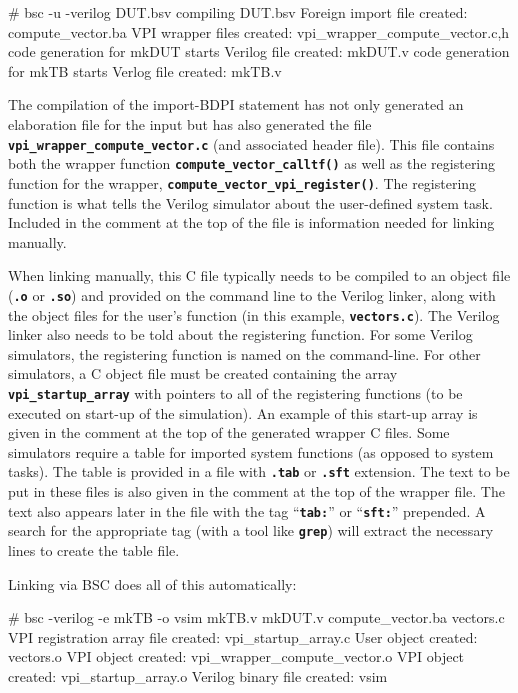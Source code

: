 \documentclass{article}
\newenvironment{centerboxverbatim}
  {\center
   \boxedverbatim}
  {\endboxedverbatim
  {\endcenter }}
\begin{document}
\begin{centerboxverbatim}
# bsc -u -verilog DUT.bsv
compiling DUT.bsv
Foreign import file created: compute_vector.ba
VPI wrapper files created: vpi_wrapper_compute_vector.{c,h}
code generation for mkDUT starts
Verilog file created: mkDUT.v
code generation for mkTB starts
Verlog file created: mkTB.v
\end{centerboxverbatim}

The compilation of the import-BDPI statement has not only generated
an elaboration file for the input but has also generated the file
{\bf\tt vpi\_wrapper\_compute\_vector.c} (and associated header file).
This file contains
both the wrapper function {\bf\tt compute\_vector\_calltf()} as
well as the registering function for the wrapper,
{\bf\tt compute\_vector\_vpi\_register()}.
The registering function is what tells the Verilog simulator about the
user-defined system task.  Included in the comment at the top of the
file is information needed for linking manually.

When linking manually, this C file typically needs to be compiled to
an object file ({\bf\tt .o} or {\bf\tt .so}) and provided on the
command line to the Verilog linker, along with the object files for
the user's function (in this example, {\bf\tt vectors.c}).  The
Verilog linker also needs to be told about the registering function.
For some Verilog simulators, the registering function is named on the
command-line.  For other simulators, a C object file must be created
containing the array {\bf\tt vpi\_startup\_array} with pointers to all
of the registering functions (to be executed on start-up of the
simulation).  An example of this start-up array is given in the comment
at the top of the generated wrapper C files.  Some simulators require
a table for imported system functions (as opposed to system tasks).
The table is provided in a file with {\bf\tt .tab} or {\bf\tt .sft}
extension.  The text to be put in these files is also given in the
comment at the top of the wrapper file.  The text also appears later
in the file with the tag ``{\bf\tt tab:}'' or ``{\bf\tt sft:}''
prepended.  A search for the appropriate tag (with a tool like {\bf\tt grep})
will extract the necessary lines to create the table file.

Linking via BSC does all of this automatically:

\begin{centerboxverbatim}
# bsc -verilog -e mkTB -o vsim mkTB.v mkDUT.v compute_vector.ba vectors.c
VPI registration array file created: vpi_startup_array.c
User object created: vectors.o
VPI object created: vpi_wrapper_compute_vector.o
VPI object created: vpi_startup_array.o
Verilog binary file created: vsim
\end{centerboxverbatim}
\end{document}

